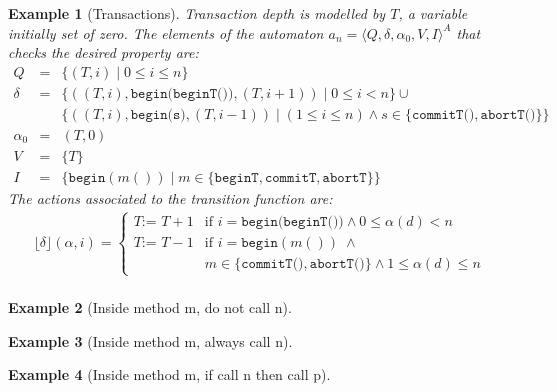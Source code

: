 \documentclass[10pt,notitlepage,twoside]{article}
\newcommand{\aut}{a}
\newcommand{\automata}[5]{\langle #1,#2,#3,#4,#5 \rangle^A}
\newcommand{\qu}{\alpha}
\newcommand{\theautomaton}{\automata{Q}{\delta}{\qu_0}{V}{I}}
\newcommand{\floor}[1]{\lfloor #1 \rfloor}
\newtheorem{example}{Example}
\begin{document}
\begin{example}[Transactions]
Transaction depth is modelled by $T$, a variable initially set of zero. The elements of the automaton $\aut_n = \theautomaton$ that checks the desired property are:
\begin{displaymath}
\begin{array}{rcl}
Q & = &  \{ (T,i) \mid 0 \leq i \leq n  \}  \\
\delta & = &  \{ ((T,i),\texttt{begin(beginT())},(T,i+1)) \mid 0 \leq i < n \} \cup \\
& & \{ ((T,i),\texttt{begin(s)},(T,i-1)) \mid (1 \leq i \leq n) \wedge s \in \{\texttt{commitT()},\texttt{abortT()}   \} \}    \\
\qu_0 & = & (T,0) \\
V & = & \{ T \} \\
I & = & \{ \texttt{begin}(m()) \mid m \in \{ \texttt{beginT}, \texttt{commitT}, \texttt{abortT} \}  \}
\end{array}
\end{displaymath}
The actions associated to the transition function are:
\begin{displaymath}
\begin{array}{l}
\floor{\delta}(\qu,i) = \left \{ \begin{array}{ll}
T \texttt{:= } T + 1 & \mbox{if } i = \texttt{begin(beginT())} \wedge 0 \leq \qu(d) < n \\
T \texttt{:= } T - 1 & \mbox{if } i = \texttt{begin}(m())\; \wedge\\
 &  m \in  \{\texttt{commitT()},\texttt{abortT()}   \} \wedge 1 \leq \qu(d) \leq n
\end{array} \right . \\
\end{array}
\end{displaymath}

\end{example}



\begin{example}[Inside method m, do not call n] \end{example}

\begin{example}[Inside method m, always call n] \end{example}

\begin{example}[Inside method m, if call n then call p]  \end{example}


\end{document}
